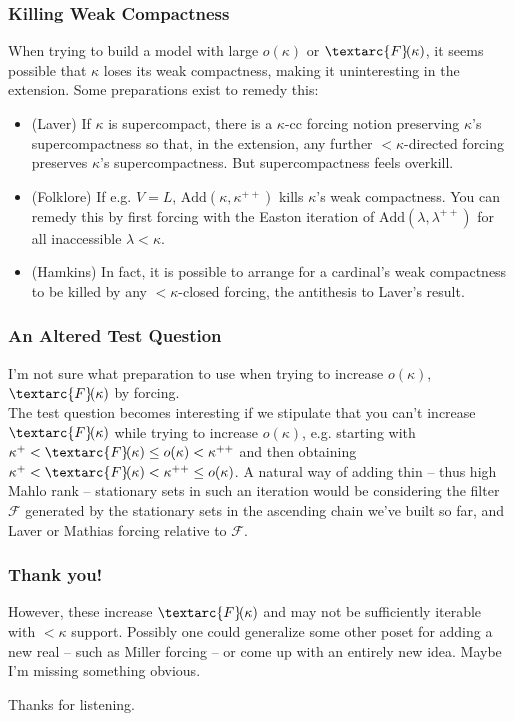 \documentclass{beamer}
\newcommand{\fehu}{\textarc{F}\!}
\begin{document}
\begin{frame}
\frametitle{Killing Weak Compactness}

When trying to build a model with large $o(\kappa)$ or $\fehu(\kappa)$, it seems possible that $\kappa$ loses its weak compactness, making it uninteresting in the extension. Some preparations exist to remedy this:
\pause
\begin{itemize}
\item (Laver) If $\kappa$ is supercompact, there is a $\kappa$-cc forcing notion preserving $\kappa$'s supercompactness so that, in the extension, any further $< \kappa$-directed forcing preserves $\kappa$'s supercompactness. But supercompactness feels overkill. \pause
\item (Folklore) If e.g. $V = L$, $\mathrm{Add}(\kappa, \kappa^{++})$ kills $\kappa$'s weak compactness. You can remedy this by first forcing with the Easton iteration of $\mathrm{Add}(\lambda, \lambda^{++})$ for all inaccessible $\lambda < \kappa$. \pause
\item (Hamkins) In fact, it is possible to arrange for a cardinal's weak compactness to be killed by \alert{any} $< \kappa$-closed forcing, the antithesis to Laver's result.
\end{itemize}
\end{frame}

\begin{frame}
\frametitle{An Altered Test Question}
I'm not sure what preparation to use when trying to increase $o(\kappa)$, $\fehu(\kappa)$ by forcing. \\

The test question becomes interesting if we stipulate that you can't increase $\fehu(\kappa)$ while trying to increase $o(\kappa)$, e.g. starting with $\kappa^+ < \fehu(\kappa) \leq o(\kappa) < \kappa^{++}$ and then obtaining $\kappa^+ < \fehu(\kappa) < \kappa^{++} \leq o(\kappa)$. \pause A natural way of adding thin -- thus high Mahlo rank -- stationary sets in such an iteration would be considering the filter $\mathcal{F}$ generated by the stationary sets in the ascending chain we've built so far, and Laver or Mathias forcing relative to $\mathcal{F}$.
\end{frame}

\begin{frame}
\frametitle{Thank you!}
However, these increase $\fehu(\kappa)$ and may not be sufficiently iterable with $< \kappa$ support. Possibly one could generalize some other poset for adding a new real -- such as Miller forcing -- or come up with an entirely new idea. Maybe I'm missing something obvious.

Thanks for listening.
\end{frame}
\end{document}

